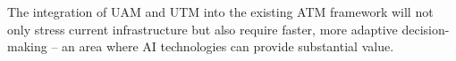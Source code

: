 The integration of \gls{UAM} and \gls{UTM} into the existing \gls{ATM} framework will not only stress current infrastructure but also require faster, more adaptive decision-making \cite{Rumba_2020} -- an area where \gls{AI} technologies can provide substantial value.

